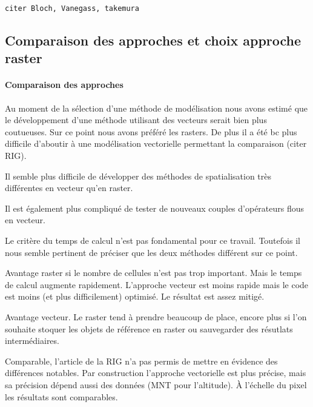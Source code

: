 \texttt{citer Bloch, Vanegass, takemura}


\subsection{Comparaison des approches et choix approche raster}

\paragraph{Comparaison des approches}


Au moment de la sélection d'une méthode de modélisation nous avons
estimé que le développement d'une méthode utilisant des vecteurs
serait bien plus coutueuses. Sur ce point nous avons préféré les
rasters. De plus il a été bc plus difficile d'aboutir à une
modélisation vectorielle permettant la comparaison (citer RIG).


Il semble plus difficile de développer des méthodes de spatialisation
très différentes en vecteur qu'en raster.

Il est également plus compliqué de tester de nouveaux couples
d'opérateurs flous en vecteur.



Le critère du temps de calcul n'est pas fondamental pour ce
travail. Toutefois il nous semble pertinent de préciser que les deux
méthodes différent sur ce point.

Avantage raster si le nombre de cellules n'est pas trop
important. Mais le temps de calcul augmente rapidement. L'approche
vecteur est moins rapide mais le code est moins (et plus
difficilement) optimisé. Le résultat est assez mitigé.


Avantage vecteur. Le raster tend à prendre beaucoup de place, encore
plus si l'on souhaite stoquer les objets de référence en raster ou
sauvegarder des résutlats intermédiaires.


Comparable, l'article de la RIG n'a pas permis de mettre en évidence
des différences notables. Par construction l'approche vectorielle est
plus précise, mais sa précision dépend aussi des données (MNT pour
l'altitude). À l'échelle du pixel les résultats sont comparables.

